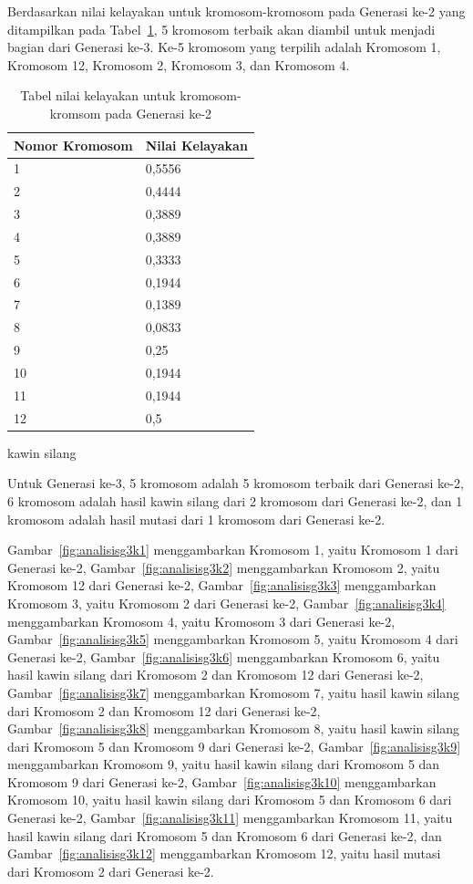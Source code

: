 \clearpage

Berdasarkan nilai kelayakan untuk kromosom-kromosom pada Generasi ke-2 yang ditampilkan pada Tabel~\ref{tab:analisishg3}, 5 kromosom terbaik akan diambil untuk menjadi bagian dari Generasi ke-3. Ke-5 kromosom yang terpilih adalah Kromosom 1, Kromosom 12, Kromosom 2, Kromosom 3, dan Kromosom 4.

\begin{table}
\centering
\captionsetup{justification=centering}
\begin{tabular}{| l | l |}
\hline
Nomor Kromosom & Nilai Kelayakan \\
\hline \hline
1 & 0,5556 \\
\hline
2 & 0,4444 \\
\hline
3 & 0,3889 \\
\hline
4 & 0,3889 \\
\hline
5 & 0,3333 \\
\hline
6 & 0,1944 \\
\hline
7 & 0,1389 \\
\hline
8 & 0,0833 \\
\hline
9 & 0,25 \\
\hline
10 & 0,1944 \\
\hline
11 & 0,1944 \\
\hline
12 & 0,5 \\
\hline
\end{tabular}
\caption[Tabel nilai kelayakan untuk kromosom-kromsom pada Generasi ke-1]{Tabel nilai kelayakan untuk kromosom-kromsom pada Generasi ke-2}
\label{tab:analisishg3}kawin silang
\end{table}

Untuk Generasi ke-3, 5 kromosom adalah 5 kromosom terbaik dari Generasi ke-2, 6 kromosom adalah hasil kawin silang dari 2 kromosom dari Generasi ke-2, dan 1 kromosom adalah hasil mutasi dari 1 kromosom dari Generasi ke-2.

Gambar~\ref{fig:analisisg3k1} menggambarkan Kromosom 1, yaitu Kromosom 1 dari Generasi ke-2, Gambar~\ref{fig:analisisg3k2} menggambarkan Kromosom 2, yaitu Kromosom 12 dari Generasi ke-2, Gambar~\ref{fig:analisisg3k3} menggambarkan Kromosom 3, yaitu Kromosom 2 dari Generasi ke-2, Gambar~\ref{fig:analisisg3k4} menggambarkan Kromosom 4, yaitu Kromosom 3 dari Generasi ke-2, Gambar~\ref{fig:analisisg3k5} menggambarkan Kromosom 5, yaitu Kromosom 4 dari Generasi ke-2, Gambar~\ref{fig:analisisg3k6} menggambarkan Kromosom 6, yaitu hasil kawin silang dari Kromosom 2 dan Kromosom 12 dari Generasi ke-2, Gambar~\ref{fig:analisisg3k7} menggambarkan Kromosom 7, yaitu hasil kawin silang dari Kromosom 2 dan Kromosom 12 dari Generasi ke-2, Gambar~\ref{fig:analisisg3k8} menggambarkan Kromosom 8, yaitu hasil kawin silang dari Kromosom 5 dan Kromosom 9 dari Generasi ke-2, Gambar~\ref{fig:analisisg3k9} menggambarkan Kromosom 9, yaitu hasil kawin silang dari Kromosom 5 dan Kromosom 9 dari Generasi ke-2, Gambar~\ref{fig:analisisg3k10} menggambarkan Kromosom 10, yaitu hasil kawin silang dari Kromosom 5 dan Kromosom 6 dari Generasi ke-2, Gambar~\ref{fig:analisisg3k11} menggambarkan Kromosom 11, yaitu hasil kawin silang dari Kromosom 5 dan Kromosom 6 dari Generasi ke-2, dan Gambar~\ref{fig:analisisg3k12} menggambarkan Kromosom 12, yaitu hasil mutasi dari Kromosom 2 dari Generasi ke-2.

